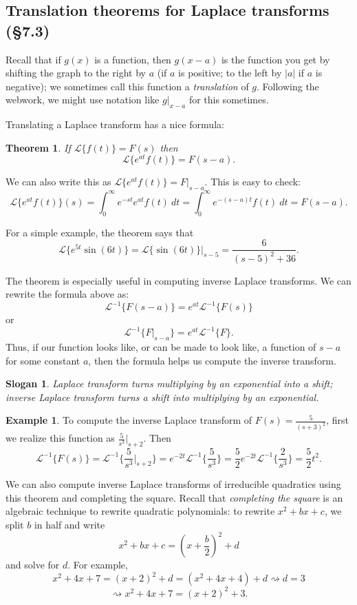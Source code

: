 \documentclass[12pt]{amsart}
\numberwithin{equation}{section}
\theoremstyle{plain} %
\newtheorem{thm}[equation]{Theorem}
\newtheorem{slogan}[equation]{Slogan}
\newcommand{\rsa}{\rightsquigarrow}
\theoremstyle{definition}
\newtheorem{ex}[equation]{Example}
\theoremstyle{remark}
\newcommand{\LA}[1]{\mathcal{L}\{ #1 \}}
\newcommand{\LAi}[1]{\mathcal{L}^{-1}\{ #1 \}}
\begin{document}
\subsection*{Translation theorems for Laplace transforms (\S7.3)}

Recall that if $g(x)$ is a function, then $g(x-a)$ is the function you get by shifting the graph to the right by $a$ (if $a$ is positive; to the left by $|a|$ if $a$ is negative); we sometimes call this function a \emph{translation} of $g$. Following the webwork, we might use notation like $g|_{x-a}$ for this sometimes.

Translating a Laplace transform has a nice formula:

\begin{thm} If $\LA{f(t)} = F(s)$ then
\[ \LA{e^{at} f(t)} = F(s-a).\]
\end{thm}

We can also write this as $\LA{e^{at} f(t)} = F|_{s-a}$.
This is easy to check:
\[ \LA{e^{at} f(t)}(s) = \int_{0}^\infty e^{-st} e^{at} f(t) \ dt = \int_{0}^\infty e^{-(s-a)t} f(t) \ dt = F(s-a).\]

For a simple example, the theorem says that 
\[\LA{ e^{5t} \sin(6t)} = \LA{\sin(6t)}|_{s-5} = \frac{6}{(s-5)^2 + 36}.\]

The theorem is especially useful in computing inverse Laplace transforms. We can rewrite the formula above as:
\[ \LAi{F(s-a)} = e^{at} \LAi{F(s)}\]
or
\[ \LAi{F|_{s-a}} = e^{at} \LAi{F}.\]
Thus, if our function looks like, or can be made to look like, a function of $s-a$ for some constant $a$, then the formula helps us compute the inverse transform.

\begin{slogan} Laplace transform turns multiplying by an exponential into a shift; inverse Laplace transform turns a shift into multiplying by an exponential.\end{slogan}

\begin{ex} To compute the inverse Laplace transform of $\displaystyle F(s) = \frac{5}{(s+3)^2}$, first we realize this function as $\displaystyle \frac{5}{s^3}|_{s+2}$. Then 
\[\LAi{F(s)} = \LAi{\frac{5}{s^3}|_{s+2}}  = e^{-2t} \LAi{\frac{5}{s^3}} = \frac{5}{2} e^{-2t} \LAi{\frac{2}{s^3}} =\frac{5}{2} t^2.\]
\end{ex}

We can also compute inverse Laplace transforms of irreducible quadratics using this theorem and completing the square. Recall that \emph{completing the square} is an algebraic technique to rewrite quadratic polynomials: to rewrite $x^2 + bx + c$, we split $b$ in half and write
\[ x^2 + bx + c = (x+\frac{b}{2})^2 + d\]
and solve for $d$.
For example,
\[ x^2 + 4x + 7 = (x+2)^2 + d = (x^2 + 4x + 4) + d \rsa d=3\]
\[ \rsa x^2 + 4x + 7 = (x+2)^2 + 3.\]
\end{document}
